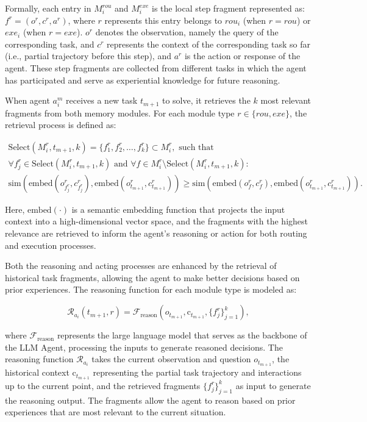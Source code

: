 \documentclass{article}
\begin{document}
Formally, each entry in $M_i^{rou}$ and $M_i^{exe}$ is the local step fragment represented as: $f^r = (o^r, c^r, a^r)$, where $r$ represents this entry belongs to $rou_i$ (when $r=rou$) or $exe_i$ (when $r=exe$). $o^r$ denotes the observation, namely the query of the corresponding task, and $c^r$ represents the context of the corresponding task so far (i.e., partial trajectory before this step), and $a^r$ is the action or response of the agent. These step fragments are collected from different tasks in which the agent has participated and serve as experiential knowledge for future reasoning.

When agent $a_i^m$ receives a new task $t_{m+1}$ to solve, it retrieves the $k$ most relevant fragments from both memory modules. For each module type $r \in \{rou, exe\}$, the retrieval process is defined as:

\begin{equation}
\begin{split}
\text{Select}(M_i^r, t_{m+1}, k) = \{f_1^r, f_2^r, \dots, f_k^r\} \subset M_i^r, \text{ such that } \\
\forall f_j^r \in \text{Select}(M_i^r, t_{m+1}, k) \text{ and } \forall f \in M_i^r \setminus \text{Select}(M_i^r, t_{m+1}, k): \\
\text{sim}(\text{embed}(o_{f_j^r}^r, c_{f_j^r}^r), \text{embed}(o_{t_{m+1}}^r, c_{t_{m+1}}^r)) \geq \text{sim}(\text{embed}(o_f^r, c_f^r), \text{embed}(o_{t_{m+1}}^r, c_{t_{m+1}}^r)).
\end{split}
\end{equation}

Here, \(\text{embed}(\cdot)\) is a semantic embedding function that projects the input context into a high-dimensional vector space, and the fragments with the highest relevance are retrieved to inform the agent's reasoning or action for both routing and execution processes.

Both the reasoning and acting processes are enhanced by the retrieval of historical task fragments, allowing the agent to make better decisions based on prior experiences.
The reasoning function for each module type is modeled as:

\begin{equation}
\mathcal{R}_{a_i}(t_{m+1}, r) = \mathcal{F}_{\text{reason}}(o_{t_{m+1}}, \text{c}_{t_{m+1}}, \{f_j^r\}_{j=1}^k),
\end{equation}

where $\mathcal{F}_{\text{reason}}$ represents the large language model that serves as the backbone of the LLM Agent, processing the inputs to generate reasoned decisions.
The reasoning function $\mathcal{R}_{a_i}$ takes the current observation and question \(o_{t_{m+1}}\), the historical context \(\text{c}_{t_{m+1}}\) representing the partial task trajectory and interactions up to the current point, and the retrieved fragments \(\{f_j^r\}_{j=1}^k\) as input to generate the reasoning output. The fragments allow the agent to reason based on prior experiences that are most relevant to the current situation.
\end{document}
